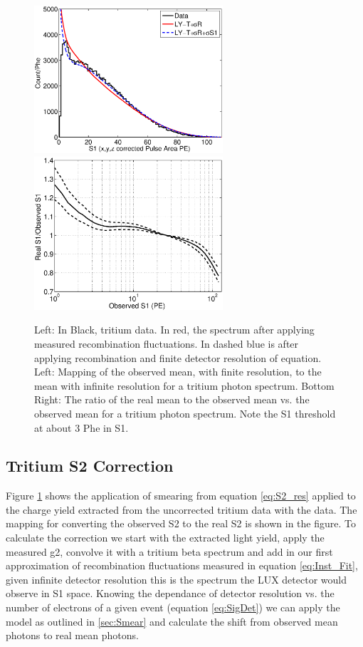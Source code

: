  \begin{figure}[h!]\centering
\includegraphics[width=70mm]{Recombination_LY_QY/Figures/S1S2_Spectra/S1_spec_compare_iter1_.eps}
\includegraphics[width=70mm]{Recombination_LY_QY/Figures/S1S2_Spectra/S1_corr_iter1_.eps}
\caption{Left: In Black, tritium data. In red, the spectrum after applying measured recombination fluctuations. In dashed blue is after applying recombination and finite detector resolution of equation. Left: Mapping of the observed mean, with finite resolution, to the mean with infinite resolution for a tritium photon spectrum. Bottom Right: The ratio of the real mean to the observed mean vs. the observed mean for a tritium photon spectrum. Note the S1 threshold at about 3 Phe in S1. }
\label{fig:S1_mapping_2}
\end{figure}

\subsection{Tritium S2 Correction}


Figure \ref{fig:S1_mapping_2} shows the application of smearing  from equation \ref{eq:S2_res} applied to the charge yield extracted from the uncorrected tritium data with the data. The mapping for converting the observed S2 to the real S2 is shown in the figure. To calculate the correction we start with the extracted light yield, apply the measured g2, convolve it with a tritium beta spectrum and add in our first approximation of recombination fluctuations measured in equation \ref{eq:Inst_Fit}, given infinite detector resolution this is the spectrum the LUX detector would observe in S1 space. Knowing the dependance of detector resolution vs. the number of electrons of a given event (equation \ref{eq:SigDet}) we can apply the model as outlined in \ref{sec:Smear} and calculate the shift from observed mean photons to real mean photons.

